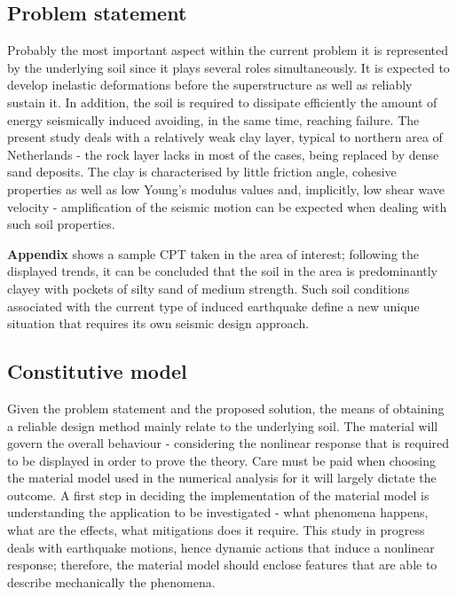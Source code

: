 \documentclass[10pt,a4paper]{report}
\begin{document}
\subsection{Problem statement}
Probably the most important aspect within the current problem it is represented by the underlying soil since it plays several roles simultaneously. It is expected to develop inelastic deformations before the superstructure as well as reliably sustain it. In addition, the soil is required to dissipate efficiently the amount of energy seismically induced avoiding, in the same time, reaching failure. The present study deals with a relatively weak clay layer, typical to northern area of Netherlands - the rock layer lacks in most of the cases, being replaced by dense sand deposits. The clay is characterised by little friction angle, cohesive properties as well as low Young's modulus values and, implicitly, low shear wave velocity - amplification of the seismic motion can be expected when dealing with such soil properties.

\textbf{Appendix} shows a sample CPT taken in the area of interest; following the displayed trends, it can be concluded that the soil in the area is predominantly clayey with pockets of silty sand of medium strength. Such soil conditions associated with the current type of induced earthquake define a new unique situation that requires its own seismic design approach.
\subsection{Constitutive model}
Given the problem statement and the proposed solution, the means of obtaining a reliable design method mainly relate to the underlying soil. The material will govern the overall behaviour - considering the nonlinear response that is required to be displayed in order to prove the theory. Care must be paid when choosing the material model used in the numerical analysis for it will largely dictate the outcome. A first step in deciding the implementation of the material model is understanding the application to be investigated - what phenomena happens, what are the effects, what mitigations does it require. This study in progress deals with earthquake motions, hence dynamic actions that induce a nonlinear response; therefore, the material model should enclose features that are able to describe mechanically the phenomena. 
\end{document}

